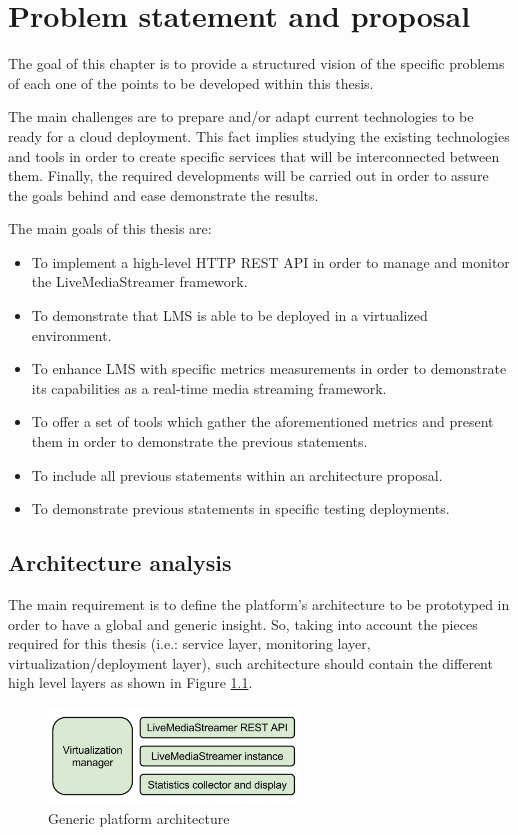 \chapter{Problem statement and proposal}\label{B:problemStatementAndProposal}

The goal of this chapter is to provide a structured vision of the specific problems of each one of the points to be developed within this thesis.

The main challenges are to prepare and/or adapt current technologies to be ready for a cloud deployment. This fact implies studying the existing technologies and tools in order to create specific services that will be interconnected between them. Finally, the required developments will be carried out in order to assure the goals behind and ease demonstrate the results.

The main goals of this thesis are:

\begin{itemize}
\item To implement a high-level HTTP REST API in order to manage and monitor the LiveMediaStreamer framework.
\item To demonstrate that LMS is able to be deployed in a virtualized environment.
\item To enhance LMS with specific metrics measurements in order to demonstrate its capabilities as a real-time media streaming framework.
\item To offer a set of tools which gather the aforementioned metrics and present them in order to demonstrate the previous statements.
\item To include all previous statements within an architecture proposal.
\item To demonstrate previous statements in specific testing deployments.
\end{itemize}

\section{Architecture analysis}

The main requirement is to define the platform's architecture to be prototyped in order to have a global and generic insight. So, taking into account the pieces required for this thesis (i.e.: service layer, monitoring layer, virtualization/deployment layer), such architecture should contain the different high level layers as shown in Figure \ref{F:genericPlatArch}.
\begin{figure}[htb]
\begin{center}
\includegraphics[width=0.6\textwidth]{./images/generalArch.png}
\caption{Generic platform architecture}
\label{F:genericPlatArch}
\end{center}
\end{figure}


